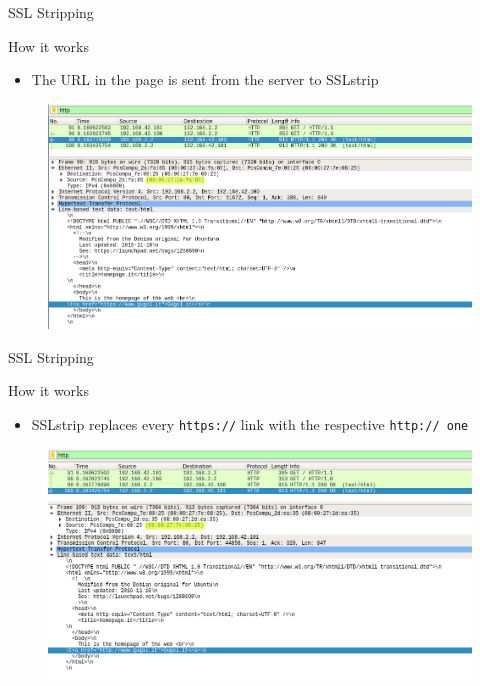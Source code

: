 \documentclass{beamer}
\begin{document}
\begin{frame}{SSL Stripping}
  \begin{block}{How it works}
    \begin{itemize}
      \item The URL in the page is sent from the server to SSLstrip
    \end{itemize}
  \end{block}
  \begin{figure}
    \includegraphics[width=\textwidth]{figures/sslstrip_https}
    \caption*{}
  \end{figure}
\end{frame}

\begin{frame}{SSL Stripping}
  \begin{block}{How it works}
    \begin{itemize}
      \item SSLstrip replaces every \texttt{https://} link with the respective \texttt{http:// one}
    \end{itemize}
  \end{block}
  \begin{figure}
    \includegraphics[width=\textwidth]{figures/sslstrip_http}
    \caption*{}
  \end{figure}
\end{frame}
\end{document}
